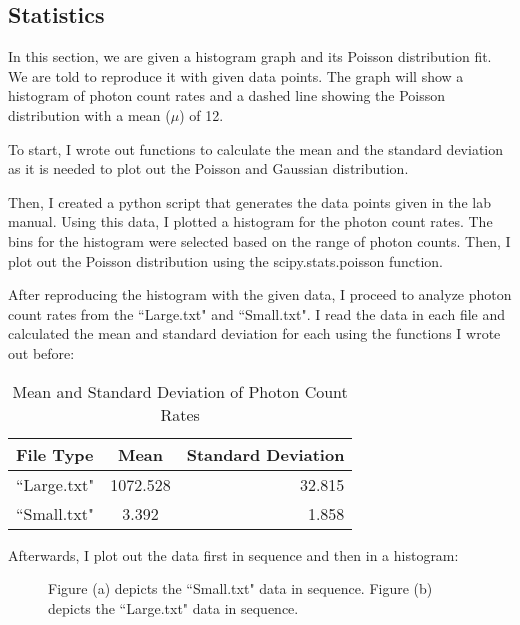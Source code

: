 \documentclass[10pt, preprint]{aastex}
\begin{document}
\subsection{Statistics}

In this section, we are given a histogram graph and its Poisson distribution fit. We are told to reproduce it with given data points. The graph will show a histogram of photon count rates and a dashed line showing the Poisson distribution with a mean ($\mu$) of 12.

To start, I wrote out functions to calculate the mean and the standard deviation as it is needed to plot out the Poisson and Gaussian distribution.

Then, I created a python script that generates the data points given in the lab manual. Using this data, I plotted a histogram for the photon count rates. The bins for the histogram were selected based on the range of photon counts. Then, I plot out the Poisson distribution using the scipy.stats.poisson function. 

\begin{figure}[H]
  \centering
\end{figure}

After reproducing the histogram with the given data, I proceed to analyze photon count rates from the ``Large.txt" and ``Small.txt". I read the data in each file and calculated the mean and standard deviation for each using the functions I wrote out before:

\begin{table}[H]
\centering
\begin{tabular}{lcr}
\hline
File Type & Mean & Standard Deviation\\\hline
``Large.txt"& 1072.528 & 32.815\\
``Small.txt" & 3.392 & 1.858\\
\end{tabular}
\caption{\label{table MeanAndStandardDeviationofFiles}Mean and Standard Deviation of Photon Count Rates}
\end{table}

Afterwards, I plot out the data first in sequence and then in a histogram:

\begin{figure}[H]
  \centering
  \hfill
  \caption{\label{fig:double plot} Figure (a) depicts the ``Small.txt" data in sequence. Figure (b) depicts the ``Large.txt" data in sequence. }
\end{figure}
\end{document}
